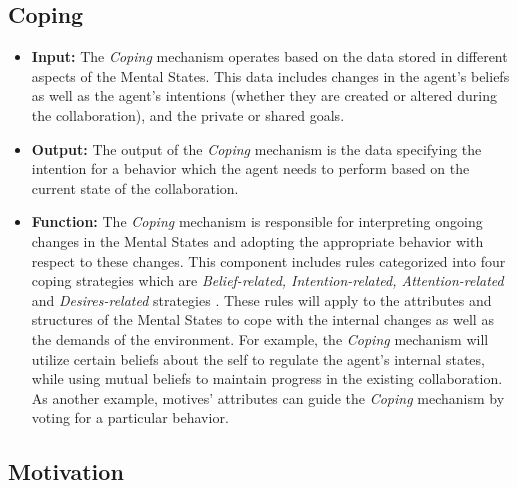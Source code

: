 \documentclass[12pt]{report}
\begin{document}
\subsection{Coping}

\begin{itemize}
  \item \textbf{Input:} The \textit{Coping} mechanism operates based on the data
  stored in different aspects of the Mental States. This data includes changes
  in the agent's beliefs as well as the agent's intentions (whether they are
  created or altered during the collaboration), and the private or shared goals.
  
  \item \textbf{Output:} The output of the \textit{Coping} mechanism is the data
  specifying the intention for a behavior which the agent needs to perform based
  on the current state of the collaboration.
  
  \item \textbf{Function:} The \textit{Coping} mechanism is responsible for
  interpreting ongoing changes in the Mental States and adopting the appropriate
  behavior with respect to these changes. This component includes rules
  categorized into four coping strategies which are \textit{Belief-related,
  Intention-related, Attention-related} and \textit{Desires-related} strategies
  \cite{marsella:ema-process-model}. These rules will apply to the attributes
  and structures of the Mental States to cope with the internal changes as well
  as the demands of the environment. For example, the \textit{Coping} mechanism
  will utilize certain beliefs about the self to regulate the agent's internal
  states, while using mutual beliefs to maintain progress in the existing
  collaboration. As another example, motives' attributes can guide the
  \textit{Coping} mechanism by voting for a particular behavior.
\end{itemize}

\subsection{Motivation}
\label{section-motivation-mechanism}
\end{document}
